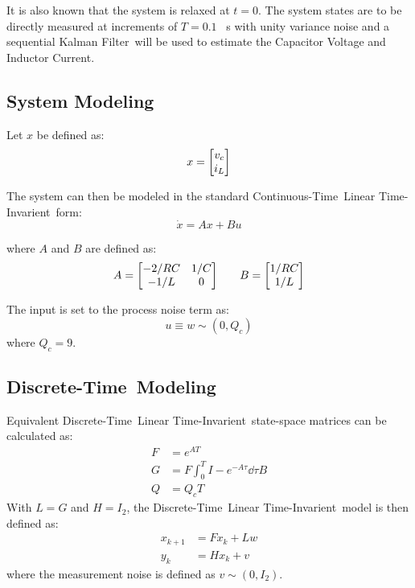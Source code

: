 \documentclass[]{article}
\newcommand{\KF}{Kalman Filter}
\newcommand{\CT}{Continuous-Time}
\newcommand{\DT}{Discrete-Time}
\newcommand{\LTI}{Linear Time-Invarient}
\begin{document}
	It is also known that the system is relaxed at $t=0$. The system states are to be directly measured at increments of $T = 0.1$ \ s with unity variance noise and a sequential \KF \ will be used to estimate the Capacitor Voltage and Inductor Current.
	
	\subsection{System Modeling}
		Let $x$ be defined as:
		\begin{equation}
			x = \mqty[v_c\\ i_L]
		\end{equation}
		
		The system can then be modeled in the standard \CT \ \LTI \ form:
		\begin{equation}
			\dot{x} = A x + B u
		\end{equation}
		
		where $A$ and $B$ are defined as:
		\begin{equation}
			\begin{aligned}
				&A = \mqty[-2/RC & 1/C\\ -1/L & 0]&& &B = \mqty[1/RC \\ 1/L]
			\end{aligned}
		\end{equation}
		
		The input is set to the process noise term as:
		\begin{equation}
			u \equiv w \sim (0, Q_c)
		\end{equation}
		where $Q_c = 9$.
		
	\subsection{\DT \ Modeling} \label{sec:DT_sys_model}
		Equivalent \DT \ \LTI \ state-space matrices can be calculated as:
		\begin{equation}
			\begin{aligned}
				F &= e^{A T}\\
				G &= F \int_0^T I - e^{-A  \tau} \dd{\tau} B\\
				Q &= Q_c T
			\end{aligned}
		\end{equation}
		With $L = G$ and $H = I_2$, the \DT \ \LTI \ model is then defined as:
		\begin{equation}
			\begin{aligned}
				x_{k+1} &= F x_k + L w\\
				y_k		&= H x_k + v
			\end{aligned}
		\end{equation}
		where the measurement noise is defined as $v \sim (0,I_2)$.\\
		
\end{document}
